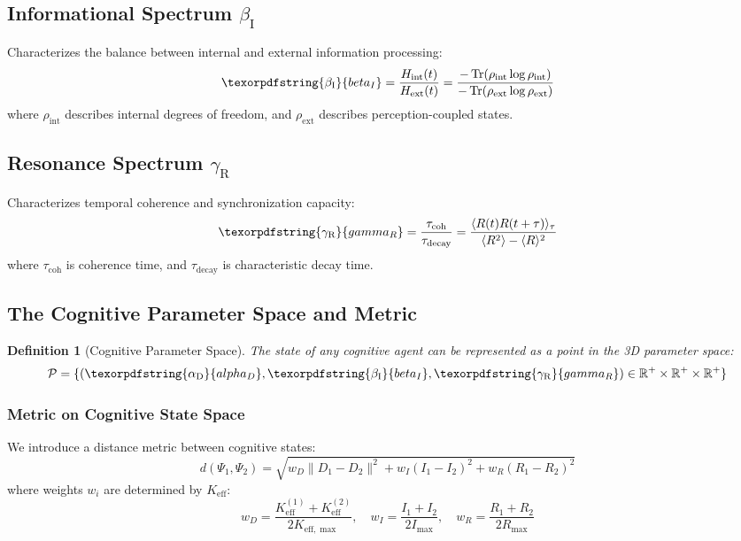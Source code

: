 \documentclass[12pt,a4paper]{article}
\newtheorem{definition}{Definition}
\DeclareMathOperator{\Tr}{Tr}
\DeclareRobustCommand{\alD}{\texorpdfstring{\ensuremath{\alpha_{\mathrm{D}}}}{alpha_D}}
\DeclareRobustCommand{\beI}{\texorpdfstring{\ensuremath{\beta_{\mathrm{I}}}}{beta_I}}
\DeclareRobustCommand{\gaR}{\texorpdfstring{\ensuremath{\gamma_{\mathrm{R}}}}{gamma_R}}
\newcommand{\eff}{\mathrm{eff}}
\newcommand{\Ke}{K_{\eff}}
\newcommand{\Kemax}{K_{\eff,\max}}
\begin{document}
	\subsection{Informational Spectrum \beI}
	
	Characterizes the balance between internal and external information processing:
	\begin{equation}
		\label{eq:betaI}
		\beI = \frac{H_{\mathrm{int}}(t)}{H_{\mathrm{ext}}(t)} = \frac{-\Tr(\rho_{\mathrm{int}}\log\rho_{\mathrm{int}})}{-\Tr(\rho_{\mathrm{ext}}\log\rho_{\mathrm{ext}})}
	\end{equation}
	where \(\rho_{\mathrm{int}}\) describes internal degrees of freedom, and \(\rho_{\mathrm{ext}}\) describes perception-coupled states.
	
	\subsection{Resonance Spectrum \gaR}
	
	Characterizes temporal coherence and synchronization capacity:
	\begin{equation}
		\label{eq:gammaR}
		\gaR = \frac{\tau_{\mathrm{coh}}}{\tau_{\mathrm{decay}}} = \frac{\langle R(t)R(t+\tau)\rangle_\tau}{\langle R^2\rangle - \langle R\rangle^2}
	\end{equation}
	where \(\tau_{\mathrm{coh}}\) is coherence time, and \(\tau_{\mathrm{decay}}\) is characteristic decay time.
	
	\subsection{The Cognitive Parameter Space and Metric}
	
	\begin{definition}[Cognitive Parameter Space]
		The state of any cognitive agent can be represented as a point in the 3D parameter space:
		\[
		\mathcal{P} = \{(\alD, \beI, \gaR) \in \mathbb{R}^+ \times \mathbb{R}^+ \times \mathbb{R}^+\}
		\]
	\end{definition}
	
	\subsubsection{Metric on Cognitive State Space}
	We introduce a distance metric between cognitive states:
	\[
	d(\Psi_1, \Psi_2) = \sqrt{w_D \|D_1 - D_2\|^2 + w_I (I_1 - I_2)^2 + w_R (R_1 - R_2)^2}
	\]
	where weights \(w_i\) are determined by \(\Ke\):
	\[
	w_D = \frac{\Ke^{(1)} + \Ke^{(2)}}{2\Kemax}, \quad w_I = \frac{I_1 + I_2}{2I_{\max}}, \quad w_R = \frac{R_1 + R_2}{2R_{\max}}
	\]
	
\end{document}
